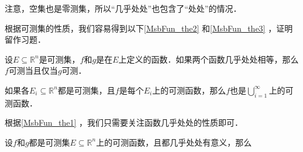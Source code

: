 注意，空集也是零测集，所以“几乎处处”也包含了“处处”的情况．

根据可测集的性质，我们容易得到以下\autoref{MsbFun_the2} 和\autoref{MsbFun_the3} ，证明留作习题．

\begin{theorem}{}\label{MsbFun_the2}
设$E\subseteq\mathbb{R}^n$是可测集，$f$和$g$是在$E$上定义的函数．如果两个函数几乎处处相等，那么$f$可测当且仅当$g$可测．
\end{theorem}



\begin{theorem}{}\label{MsbFun_the3}
如果各$E_i\subseteq\mathbb{R}^n$都是可测集，且$f$是每个$E_i$上的可测函数，那么$f$也是$\bigcup_{i=1}^\infty$上的可测函数．
\end{theorem}

根据\autoref{MsbFun_the1} ，我们只需要关注函数几乎处处的性质即可．

\begin{theorem}{}
设$f$和$g$都是可测集$E\subseteq\mathbb{R}^n$上的可测函数，且都几乎处处有意义，那么
\end{theorem}




